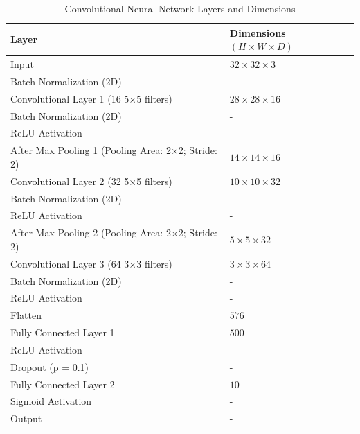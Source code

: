 \documentclass{article}
\begin{document}
\begin{table}[h!]
    \centering
    \begin{tabular}{|l|l|}
    \hline
    \textbf{Layer} & \textbf{Dimensions $(H \times W \times D)$} \\
    \hline
    Input & $32 \times 32 \times 3$ \\
    Batch Normalization (2D) & - \\
    Convolutional Layer 1 (16 5$\times$5 filters) & $28 \times 28 \times 16$ \\
    Batch Normalization (2D) & - \\
    ReLU Activation & - \\
    After Max Pooling 1 (Pooling Area: 2$\times$2; Stride: 2) & $14 \times 14 \times 16$ \\
    Convolutional Layer 2 (32 5$\times$5 filters)& $10 \times 10 \times 32$ \\
    Batch Normalization (2D) & - \\
    ReLU Activation & - \\
    After Max Pooling 2 (Pooling Area: 2$\times$2; Stride: 2)& $5 \times 5 \times 32$ \\
    Convolutional Layer 3 (64 3$\times$3 filters)& $3 \times 3 \times 64$ \\
    Batch Normalization (2D) & - \\
    ReLU Activation & - \\
    Flatten & $576$ \\
    Fully Connected Layer 1 & $500$ \\
    ReLU Activation & - \\
    Dropout (p = 0.1) & - \\
    Fully Connected Layer 2 & $10$ \\
    Sigmoid Activation & - \\
    Output & - \\
    \hline
    \end{tabular}
    \caption{Convolutional Neural Network Layers and Dimensions}
    \label{table:cnn_layers}
\end{table}
\end{document}
